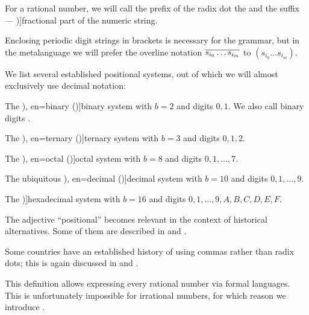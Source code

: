 \begin{definition}
  For a rational number, we will call the prefix of the radix dot the  and the suffix --- \term[en=fractional part (\cite[214]{Knuth1997ArtVol2})]{fractional part} of the numeric string.

  Enclosing periodic digit strings in brackets is necessary for the grammar, but in the metalanguage we will prefer the overline notation \( \oline{s_{i_0} \ldots s_{i_m}} \) to \( (s_{i_0} \ldots s_{i_m}) \).

  We list several established positional systems, out of which we will almost exclusively use decimal notation:
  \begin{thmenum}
     The \term[ru=двоичная (система) (\cite[60]{Зорич2019АнализЧасть1}), en=binary (\cite[195]{Knuth1997ArtVol2})]{binary} system with \( b = 2 \) and digits \( 0, 1 \). We also call binary digits .

     The \term[ru=троичная (система) (\cite[60]{Зорич2019АнализЧасть1}), en=ternary (\cite[195]{Knuth1997ArtVol2})]{ternary} system with \( b = 3 \) and digits \( 0, 1, 2 \).

     The \term[ru=восьмичная (система) (\cite[60]{Зорич2019АнализЧасть1}), en=octal (\cite[\S 4.2.2]{Rosen2019DiscreteMathematics})]{octal} system with \( b = 8 \) and digits \( 0, 1, \ldots, 7 \).

     The ubiquitous \term[ru=десетичная (система) (\cite[60]{Зорич2019АнализЧасть1}), en=decimal (\cite[195]{Knuth1997ArtVol2})]{decimal} system with \( b = 10 \) and digits \( 0, 1, \ldots, 9 \).

     The \term[en=hexadecimal (\cite[195]{Knuth1997ArtVol2})]{hexadecimal} system with \( b = 16 \) and digits \( 0, 1, \ldots, 9, A, B, C, D, E, F \).
  \end{thmenum}
\end{definition}
\begin{comments}
  \item The adjective \enquote{positional} becomes relevant in the context of historical alternatives. Some of them are described in \cite[ch. 1]{АлександровМаркушевичХинчин1951ЭнциклопедияТом1} and \cite[sec. 4.1]{Knuth1997ArtVol2}.

  \item Some countries have an established history of using commas rather than radix dots; this is again discussed in \cite[ch. 1]{АлександровМаркушевичХинчин1951ЭнциклопедияТом1} and \cite[sec. 4.1]{Knuth1997ArtVol2}.

  \item This definition allows expressing every rational number via formal languages. This is unfortunately impossible for irrational numbers, for which reason we introduce .
\end{comments}

